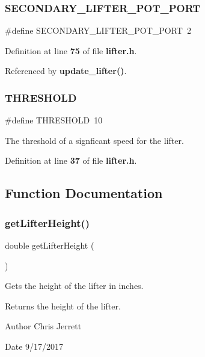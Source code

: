 \subsubsection{S\+E\+C\+O\+N\+D\+A\+R\+Y\+\_\+\+L\+I\+F\+T\+E\+R\+\_\+\+P\+O\+T\+\_\+\+P\+O\+RT}
{\footnotesize\ttfamily \#define S\+E\+C\+O\+N\+D\+A\+R\+Y\+\_\+\+L\+I\+F\+T\+E\+R\+\_\+\+P\+O\+T\+\_\+\+P\+O\+RT~2}



Definition at line \textbf{ 75} of file \textbf{ lifter.\+h}.



Referenced by \textbf{ update\+\_\+lifter()}.

\mbox{\label{lifter_8h_a4679d8ea8690999a6c6c7c0cb245c879}} 
\subsubsection{T\+H\+R\+E\+S\+H\+O\+LD}
{\footnotesize\ttfamily \#define T\+H\+R\+E\+S\+H\+O\+LD~10}



The threshold of a signficant speed for the lifter. 



Definition at line \textbf{ 37} of file \textbf{ lifter.\+h}.



\subsection{Function Documentation}
\mbox{\label{lifter_8h_a2719740958fd8a5926f88f6194e820e3}} 
\subsubsection{get\+Lifter\+Height()}
{\footnotesize\ttfamily double get\+Lifter\+Height (\begin{DoxyParamCaption}{ }\end{DoxyParamCaption})}



Gets the height of the lifter in inches. 

\begin{DoxyReturn}{Returns}
the height of the lifter. 
\end{DoxyReturn}
\begin{DoxyAuthor}{Author}
Chris Jerrett 
\end{DoxyAuthor}
\begin{DoxyDate}{Date}
9/17/2017 
\end{DoxyDate}


